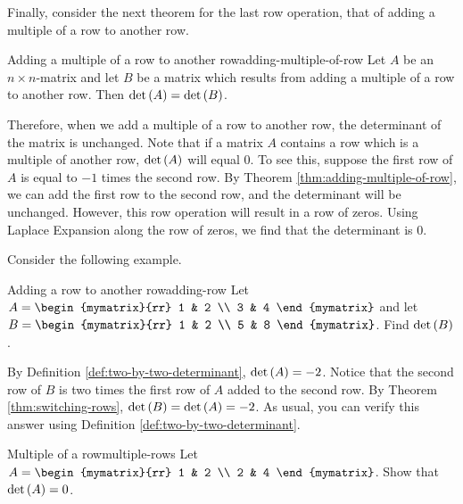 Finally, consider the next theorem for the last row operation, that of adding a multiple of a row
to another row. 

\begin{theorem}{Adding a multiple of a row to another row}{adding-multiple-of-row}
Let $A$ be an $n\times n$-matrix and let $B$ be a matrix
which results from adding a multiple of a row to another row.
 Then $\det \left(A\right) =\det
\left(B \right)$.
\end{theorem}

Therefore, when we add a multiple of a row to another row, the determinant of the matrix is unchanged. 
Note that if a matrix $A$ contains a row which is a multiple of another row, $\det \left(A\right)$ will equal $0$. To see this,
suppose the first row of $A$ is equal to $-1$ times the second row. By Theorem \ref{thm:adding-multiple-of-row}, we can 
add the first row to the second row, and the determinant will be unchanged. However, this row operation will result in a row of zeros.
Using Laplace Expansion along the row of zeros, we find that the determinant is $0$. 

Consider the following example.

\begin{example}{Adding a row to another row}{adding-row}
Let $A=\begin{mymatrix}{rr}
1 & 2 \\
3 & 4
\end{mymatrix} $ and let $B=\begin{mymatrix}{rr}
1 & 2 \\
5 & 8
\end{mymatrix}$. 
Find $\det \left(B\right)$.
\end{example}

\begin{solution}
By Definition \ref{def:two-by-two-determinant}, $\det \left(A\right) = -2$. 
Notice that the second row of $B$ is two times the first row of $A$ added
to the second row. 
By Theorem \ref{thm:switching-rows}, $\det \left(B\right) = \det \left(A \right)
=-2$.
As usual, you can verify this answer using Definition \ref{def:two-by-two-determinant}.
\end{solution}

\begin{example}{Multiple of a row}{multiple-rows}
Let $A = \begin{mymatrix}{rr}
1 & 2 \\
2 & 4 
\end{mymatrix}$. Show that $\det \left(A \right) = 0$. 
\end{example}

